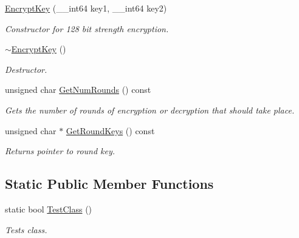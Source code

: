 \begin{DoxyCompactItemize}
\hyperlink{class_encrypt_key_abe5940dbf3981c08fffe29d210290ead}{EncryptKey} (\_\-\_\-int64 key1, \_\-\_\-int64 key2)
\begin{DoxyCompactList}\small\item\em Constructor for 128 bit strength encryption. \item\end{DoxyCompactList}\item 
\hypertarget{class_encrypt_key_a8da0651f59463415d9009d068bbd671a}{
\hyperlink{class_encrypt_key_a8da0651f59463415d9009d068bbd671a}{$\sim$EncryptKey} ()}
\label{class_encrypt_key_a8da0651f59463415d9009d068bbd671a}

\begin{DoxyCompactList}\small\item\em Destructor. \item\end{DoxyCompactList}\item 
unsigned char \hyperlink{class_encrypt_key_adc72eab7b96343f9ce9d513eaf225056}{GetNumRounds} () const 
\begin{DoxyCompactList}\small\item\em Gets the number of rounds of encryption or decryption that should take place. \item\end{DoxyCompactList}\item 
unsigned char $\ast$ \hyperlink{class_encrypt_key_a76212380b28d9a2e28d5b6ce200accf8}{GetRoundKeys} () const 
\begin{DoxyCompactList}\small\item\em Returns pointer to round key. \item\end{DoxyCompactList}\end{DoxyCompactItemize}
\subsection*{Static Public Member Functions}
\begin{DoxyCompactItemize}
\item 
static bool \hyperlink{class_encrypt_key_af1733dd51e9839966c3cb6ca75f822ec}{TestClass} ()
\begin{DoxyCompactList}\small\item\em Tests class. \item\end{DoxyCompactList}\end{DoxyCompactItemize}
